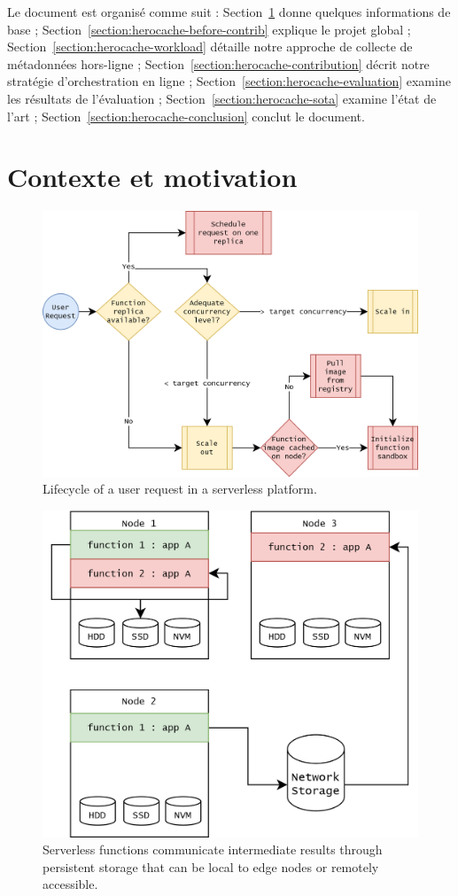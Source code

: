 Le document est organisé comme suit : Section~\ref{section:herocache-background} donne quelques informations de base ; Section~\ref{section:herocache-before-contrib} explique le projet global ; Section~\ref{section:herocache-workload} détaille notre approche de collecte de métadonnées hors-ligne ; Section~\ref{section:herocache-contribution} décrit notre stratégie d'orchestration en ligne ; Section~\ref{section:herocache-evaluation} examine les résultats de l'évaluation ; Section~\ref{section:herocache-sota} examine l'état de l'art ; Section~\ref{section:herocache-conclusion} conclut le document.

\section{Contexte et motivation}
\label{section:herocache-background}

\begin{figure}[t]
\centering
\includegraphics[width=0.8\columnwidth]{5_Chapitre5/figures/function-cache.png}
\caption{Lifecycle of a user request in a serverless platform.}
\label{figure:herocache-function-cache}
\end{figure}

\begin{figure}[t]
\centering
\includegraphics[width=0.8\columnwidth]{5_Chapitre5/figures/function-communications.png}
\caption{Serverless functions communicate intermediate results through persistent storage that can be local to edge nodes or remotely accessible.}
\label{figure:herocache-function-communications}
\end{figure}

